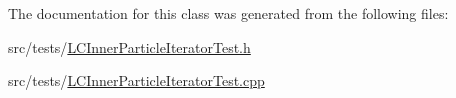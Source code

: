 The documentation for this class was generated from the following files\-:\begin{DoxyCompactItemize}
\item 
src/tests/\hyperlink{LCInnerParticleIteratorTest_8h}{L\-C\-Inner\-Particle\-Iterator\-Test.\-h}\item 
src/tests/\hyperlink{LCInnerParticleIteratorTest_8cpp}{L\-C\-Inner\-Particle\-Iterator\-Test.\-cpp}\end{DoxyCompactItemize}
